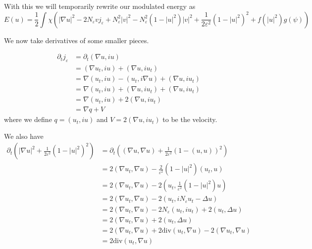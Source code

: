\documentclass[a4paper]{article}
\renewcommand{\div}{\mathrm{div}}
\begin{document}
With this we will temporarily rewrite our modulated energy as
\begin{equation} \label{eqn:mod_energy2}
  E(u) = \frac{1}{2} \int \chi \left( |\nabla u|^2 - 2N_\varepsilon v j_\varepsilon + N_\varepsilon^2 |v|^2 - N_\varepsilon^2(1-|u|^2)|v|^2 +
  \frac{1}{2 \varepsilon^2} (1 - |u|^2)^2 + f(|u|^2) g(\psi) \right)
\end{equation}

We now take derivatives of some smaller pieces.

\begin{align}
  \partial_t j_\varepsilon &= \partial_t (\nabla u, iu) \nonumber \\
  &= ( \nabla u_t, iu) + ( \nabla u, i u_t) \nonumber \\
  &= \nabla (u_t, iu) - (u_t, i \nabla u) + (\nabla u, iu_t) \nonumber \\
  &= \nabla (u_t, iu) + (\nabla u, iu_t) + (\nabla u, iu_t) \nonumber \\
  &= \nabla (u_t, iu) + 2 (\nabla u, iu_t) \nonumber \\
  &= \nabla q + V
  \label{eqn:deriv_current}
\end{align}
where we define $q = (u_t, iu)$ and $V=2(\nabla u, iu_t)$ to be the velocity.

We also have
\begin{align}
  \partial_t \left( |\nabla u|^2 + \frac{1}{2 \varepsilon^2} (1-|u|^2)^2 \right)
  &= \partial_t \left( (\nabla u, \nabla u) + \frac{1}{2 \varepsilon^2} (1-(u,u))^2 \right) \nonumber \\
  &= 2 (\nabla u_t, \nabla u) - \frac{2}{\varepsilon^2} (1-|u|^2) (u_t, u) \nonumber \\
  &= 2( \nabla u_t, \nabla u) - 2 ( u_t, \frac{1}{\varepsilon^2} (1-|u|^2)u ) \nonumber \\
  &= 2( \nabla u_t, \nabla u) - 2( u_t, i N_\varepsilon u_t - \Delta u) \nonumber \\
  &= 2( \nabla u_t, \nabla u) - 2 N_\varepsilon ( u_t, i u_t) + 2(u_t, \Delta u) \nonumber \\
  &= 2( \nabla u_t, \nabla u) + 2(u_t, \Delta u) \nonumber \\
  &= 2( \nabla u_t, \nabla u) + 2 \div (u_t, \nabla u) - 2 (\nabla u_t, \nabla u) \nonumber \\
  &= 2 \div (u_t, \nabla u)
  \label{eqn:deriv_?}
\end{align}
\end{document}
